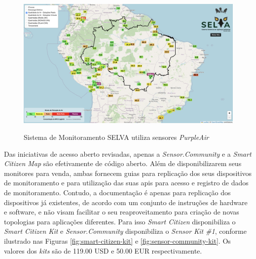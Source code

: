 \begin{figure}[h]
    \centering
    \caption{Sistema de Monitoramento SELVA utiliza sensores \textit{PurpleAir}}
    \includegraphics[width=\textwidth]{chapters/1-MONITORAMENTO/Figuras/SELVA.png}
    \label{fig:selva-purple-air}
\end{figure}

Das iniciativas de acesso aberto revisadas, apenas a \textit{Sensor.Community} e a \textit{Smart Citizen Map} são efetivamente de código aberto. Além de disponibilizarem seus monitores para venda, ambas fornecem guias para replicação dos seus dispositivos de monitoramento e para utilização das suas \acrshort{api}s para acesso e registro de dados de monitoramento. Contudo, a documentação é apenas para replicação dos dispositivos já existentes, de acordo com um conjunto de instruções de hardware e software, e não visam facilitar o seu reaproveitamento para criação de novas topologias para aplicações diferentes. Para isso \textit{Smart Citizen} disponibiliza o \textit{Smart Citizen Kit} e \textit{Sensor.Community} disponibiliza o \textit{Sensor Kit \#1}, conforme ilustrado nas Figuras \ref{fig:smart-citizen-kit} e \ref{fig:sensor-community-kit}. Os valores dos \textit{kits} são de 119.00 USD e 50.00 EUR respectivamente.

